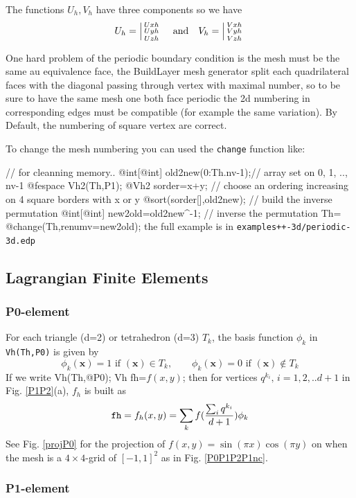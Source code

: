 \documentclass[a4paper,twoside,12pt]{book}
\begin{document}
The functions $U_{h},V_{h}$ have three components so we have
$$U_{h}=\left|\begin{smallmatrix} Uxh \\ Uyh \\ Uzh\end{smallmatrix}\right.  \quad \mbox{and}\quad V_{h}=\left|\begin{smallmatrix} Vxh \\ Vyh \\ Vzh\end{smallmatrix}\right.$$

\begin{note}\label{note-p3d} One hard  problem of the periodic boundary condition is the mesh must be the same
au equivalence face, the BuildLayer mesh generator split each  quadrilateral  faces with the diagonal
passing through vertex with maximal number, so to be sure to have the same mesh one both face periodic
the 2d numbering in corresponding edges must be compatible (for example the same variation).
By Default, the numbering of square vertex are correct. 

To change the mesh numbering you can used the \texttt{change} function like:

\bFF
{ // for cleanning  memory..
@int[@int] old2new(0:Th.nv-1);// array set on 0, 1, .., nv-1
@fespace Vh2(Th,P1);
@Vh2 sorder=x+y; // choose an ordering  increasing on 4 square borders with x or y
@sort(sorder[],old2new); // build the inverse permutation 
@int[@int]  new2old=old2new^-1;   // inverse the permutation 
Th= @change(Th,renumv=new2old);
}
\eFF
the full example is in \texttt{examples++-3d/periodic-3d.edp}
\end{note}



\subsection{Lagrangian Finite Elements}
\label{sec:P0P1P2}
\subsubsection{P0-element}
For each triangle (d=2)  or tetrahedron (d=3)  $T_k$, the basis function $\phi_k$ in \texttt{Vh(Th,P0)}
is given by
$$
\phi_k(\bm{x})=1\textrm{ if }(\bm{x})\in T_k,\qquad
\phi_k(\bm{x})=0\textrm{ if }(\bm{x})\not\in T_k
$$
If we write
\bFF
Vh(Th,@P0);  Vh fh=$f(x,y)$;
\eFF
then for vertices $q^{k_i},\, i=1,2,.. d+1 $ in Fig. \ref{P1P2}(a), $f_h$ is built as
$$
\ttCC{fh}=f_h(x,y)=\sum_k f(\frac{\sum_i q^{k_i}}{d+1}) \phi_k
$$
See Fig. \ref{projP0} for the projection of $f(x,y)=\sin(\pi x)\cos(\pi y)$
on  when
the mesh  is a $4\times 4$-grid of $[-1,1]^2$ as in Fig. \ref{P0P1P2P1nc}.

\subsubsection{P1-element}
\end{document}
